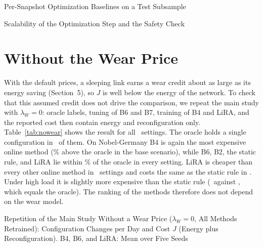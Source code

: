 \documentclass[preprint,12pt]{elsarticle}
\begin{document}
\begin{table}[h!]
\centering
\caption{Per-Snapshot Optimization Baselines on a Test Subsample}
\label{tab:opt}
\footnotesize
\setlength{\tabcolsep}{4pt}
\begin{adjustbox}{max width=\linewidth}\end{adjustbox}
\end{table}


\begin{table}[h!]
\centering
\caption{Scalability of the Optimization Step and the Safety Check}
\label{tab:scale}
\footnotesize
\setlength{\tabcolsep}{2pt}
\begin{adjustbox}{max width=\linewidth}\end{adjustbox}
\end{table}


\section{Without the Wear Price}\label{sec:res-nowear}

With the default prices, a sleeping link earns a wear credit about as large as its energy saving (Section~5), so $J$ is well below the energy of the network. To check that this assumed credit does not drive the comparison, we repeat the main study with $\lambda_W=0$: oracle labels, tuning of B6 and B7, training of B4 and LiRA, and the reported cost then contain energy and reconfiguration only. Table~\ref{tab:nowear} shows the result for all \nwSettings\ settings. The oracle holds a single configuration in \nwOconst\ of them. On Nobel-Germany B4 is again the most expensive online method (\nwBfourExcessbase\% above the oracle in the base scenario), while B6, B2, the static rule, and LiRA lie within \nwHoldMaxGap\% of the oracle in every setting. LiRA is cheaper than every other online method in \nwLiraBest\ settings and costs the same as the static rule in \nwStaticSame. Under high load it is slightly more expensive than the static rule (\nwJLiRAhl\ against \nwJStatichl, which equals the oracle). The ranking of the methods therefore does not depend on the wear model.




\begin{table}[h!]
\centering
\caption{Repetition of the Main Study Without a Wear Price ($\lambda_W=0$, All Methods Retrained): Configuration Changes per Day and Cost $J$ (Energy plus Reconfiguration). B4, B6, and LiRA: Mean over Five Seeds}
\label{tab:nowear}
\footnotesize
\setlength{\tabcolsep}{3pt}
\begin{adjustbox}{max width=\linewidth}\end{adjustbox}
\end{table}
\end{document}
